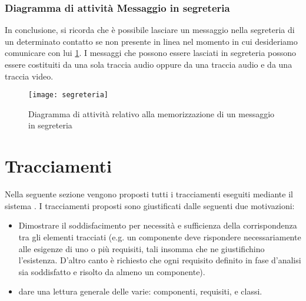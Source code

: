 \subsubsection{Diagramma di attività Messaggio in segreteria}
In conclusione, si ricorda che è possibile lasciare un messaggio nella segreteria di un determinato contatto se non presente in linea nel momento in cui desideriamo comunicare con lui \ref{fig:ADmessegreteria}. I messaggi che possono essere lasciati in segreteria possono essere costituiti da una sola traccia audio oppure da una traccia audio e da una traccia video.

\begin{figure}[H]
  \centering
  \texttt{[image: segreteria]}
  \caption{Diagramma di attività relativo alla memorizzazione di un messaggio in segreteria}\label{fig:ADmessegreteria}
\end{figure}
\clearpage

\section{Tracciamenti}\label{sec:tracciamenti}
Nella seguente sezione vengono proposti tutti i tracciamenti eseguiti mediante il sistema \manager. I tracciamenti proposti sono giustificati dalle seguenti due motivazioni:

\begin{itemize}
	\item Dimostrare il soddisfacimento per necessità e sufficienza della corrispondenza tra gli elementi tracciati (e.g. un componente deve rispondere necessariamente alle esigenze di uno o più requisiti, tali insomma che ne giustifichino l'esistenza. D'altro canto è richiesto che ogni requisito definito in fase d'analisi sia soddisfatto e risolto da almeno un componente).
	\item dare una lettura generale delle varie: componenti, requisiti,  e classi.
\end{itemize}





